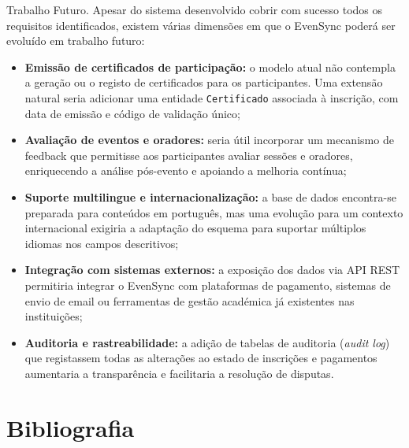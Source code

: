 \documentclass[runningheads]{llncs}
\begin{document}
        Trabalho Futuro. Apesar do sistema desenvolvido cobrir com sucesso todos os requisitos identificados, existem várias 
        dimensões em que o EvenSync poderá ser evoluído em trabalho futuro:

        \begin{itemize}
            \item \textbf{Emissão de certificados de participação:} o modelo atual não
            contempla a geração ou o registo de certificados para os participantes. Uma
            extensão natural seria adicionar uma entidade \texttt{Certificado} associada
            à inscrição, com data de emissão e código de validação único;

            \item \textbf{Avaliação de eventos e oradores:} seria útil incorporar um
            mecanismo de feedback que permitisse aos participantes avaliar sessões e oradores,
            enriquecendo a análise pós-evento e apoiando a melhoria contínua;

            \item \textbf{Suporte multilingue e internacionalização:} a base de dados
            encontra-se preparada para conteúdos em português, mas uma evolução para um
            contexto internacional exigiria a adaptação do esquema para suportar múltiplos
            idiomas nos campos descritivos;

            \item \textbf{Integração com sistemas externos:} a exposição dos dados via API
            REST permitiria integrar o EvenSync com plataformas de pagamento, sistemas de
            envio de email ou ferramentas de gestão académica já existentes nas instituições;

            \item \textbf{Auditoria e rastreabilidade:} a adição de tabelas de auditoria
            (\textit{audit log}) que registassem todas as alterações ao estado de inscrições
            e pagamentos aumentaria a transparência e facilitaria a resolução de disputas.
        \end{itemize}
                
        \section{Bibliografia}
\end{document}
